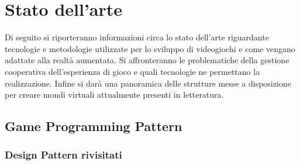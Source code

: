\chapter{Stato dell'arte}\label{chap:Letteratura}
Di seguito si riporteranno informazioni circa lo stato dell'arte riguardante
tecnologie e metodologie utilizzate per lo sviluppo di videogiochi e come 
vengano adattate alla realtà aumentata. Si affronteranno le problematiche della 
gestione cooperativa dell'esperienza di gioco e quali tecnologie ne permettano 
la realizzazione. Infine si darà una panoramica delle strutture messe a 
disposizione per creare mondi virtuali attualmente presenti in letteratura.

\section{Game Programming Pattern}\label{sec:GameProgrammingPattern}

\subsection{Design Pattern rivisitati}\label{ssec:DesignPattern}

